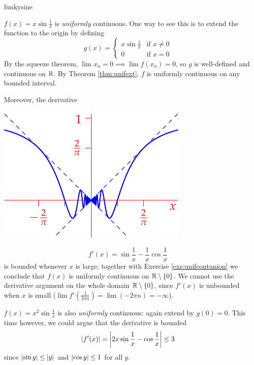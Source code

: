 \begin{examples}{}{funkysine}
\begin{enumerate}
	
		\begin{minipage}[t]{0.6\linewidth}\vspace{0pt}
			\item $f(x)=x\sin\frac 1x$ is \emph{uniformly} continuous. One way to see this is to extend the function to the origin by defining
			\[
				g(x)=
				\begin{cases}
					x\sin \frac 1x&\text{if }x\neq 0\\
					0&\text{if }x=0
				\end{cases}
			\]
			By the squeeze theorem, $\lim x_n=0\implies \lim f(x_n)=0$, so $g$ is well-defined and continuous on $\mathbb{R}$. By Theorem \ref{thm:unifext}, $f$ is uniformly continuous on any bounded interval.\par
			Moreover, the derivative
		\end{minipage}
		\hfill
		\begin{minipage}[t]{0.39\linewidth}\vspace{0pt}
			\flushright\includegraphics[scale=0.95]{unifcontex2}
		\end{minipage}\par\vspace{-4pt}
		\[
			f'(x)=\sin\frac 1x-\frac 1x\cos\frac 1x
		\]
		is bounded whenever $x$ is large; together with Exercise \ref{exs:unifcontunion} we conclude that $f(x)$ is uniformly continuous on $\mathbb{R}\setminus\{0\}$. We cannot use the derivative argument on the whole domain $\mathbb{R}\setminus\{0\}$, since $f'(x)$ is unbounded when $x$ is small ($\lim f'\left(\frac 1{2\pi n}\right)=\lim(-2\pi n)=-\infty$).

		\begin{minipage}[t]{0.6\linewidth}\vspace{-5pt}
			\item\label{ex:funkysine3} $f(x)=x^2\sin\frac 1x$ is also \emph{uniformly} continuous: again extend by $g(0)=0$. This time however, we could argue that the derivative is bounded
			\[
			\left| f'(x)\right|=
				\left| 2x\sin\frac 1x-\cos\frac 1x\right|\le 3
			\]
			since $\left| \sin y\right|\le\left| y\right|$ and $\left| \cos y\right|\le 1$ for all $y$.\smallbreak
			

\end{minipage}
\end{enumerate}
\end{examples}
